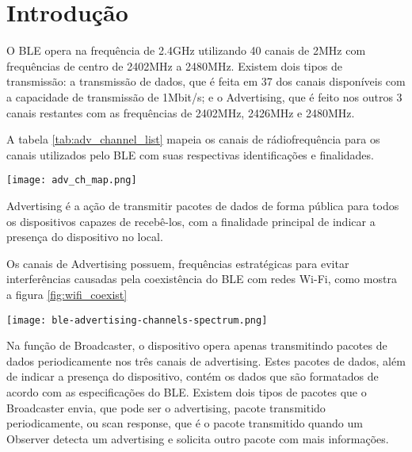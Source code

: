 \section{Introdução}





O BLE opera na frequência de 2.4GHz utilizando 40 canais de 2MHz com
frequências de centro de 2402MHz a 2480MHz. Existem dois tipos de transmissão: a
transmissão de dados, que é feita em 37 dos canais disponíveis com a capacidade
de transmissão de 1Mbit/s; e o Advertising, que é feito nos outros 3 canais
restantes com as frequências de 2402MHz, 2426MHz e 2480MHz.\cite{ble4core}

A tabela \ref{tab:adv_channel_list} mapeia os canais de rádiofrequência para os canais
utilizados pelo BLE com suas respectivas identificações e finalidades.

\begin{center}
	\centering 
	\texttt{[image: adv\_ch\_map.png]}
	\label{tab:adv_channel_list}
\end{center} 

Advertising é a ação de transmitir pacotes de dados de forma pública para todos
os dispositivos capazes de recebê-los, com a finalidade principal de indicar a
presença do dispositivo no local.

Os canais de Advertising possuem, frequências estratégicas para evitar
interferências causadas pela coexistência do BLE com redes Wi-Fi, como 
mostra a figura \ref{fig:wifi_coexist}

\begin{center}
	\centering 
	\texttt{[image: ble-advertising-channels-spectrum.png]}
	\label{tab:adv_channel_list}
\end{center} 


Na função de Broadcaster, o dispositivo opera apenas transmitindo pacotes de dados periodicamente nos três canais de advertising. 
Estes pacotes de dados, além de indicar a presença do dispositivo, contém os dados que são formatados de acordo com as especificações do BLE. 
Existem dois tipos de pacotes que o Broadcaster envia, que pode ser o advertising, pacote transmitido periodicamente, ou scan response,
que é o pacote transmitido quando um Observer detecta um advertising e solicita outro pacote com mais informações.

